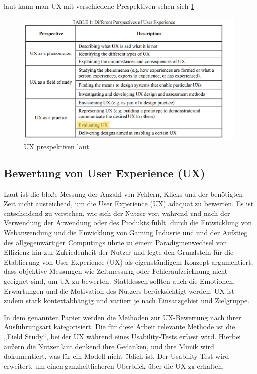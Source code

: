 \documentclass[12pt,oneside]{article}
\begin{document}
laut \cite{GOISTAI} kann man UX mit verschiedene Prespektiven sehen sieh \ref{fig:1}
\begin{figure}[b!]
\centering
 \includegraphics[width=15cm]{UXprespektiven.png}
		\caption{UX prespektiven laut \cite{GOISTAI}}
		\label{fig:1}
\end{figure}



\subsection{Bewertung von User Experience (UX)}

Laut \cite{GOISTAI} ist die bloße Messung der Anzahl von Fehlern, Klicks und der benötigten Zeit nicht ausreichend, um die User Experience (UX) adäquat zu bewerten. Es ist entscheidend zu verstehen, wie sich der Nutzer vor, während und nach der Verwendung der Anwendung oder des Produkts fühlt.
durch die Entwicklung von Webanwendung und die Enwicklung von Gaming Indusrie und und der Aufstieg des allgegenwärtigen Computings ührte zu einem Paradigmenwechsel von Effizienz hin zur Zufriedenheit der Nutzer und legte den Grundstein für die Etablierung von User Experience (UX) als eigenständigem Konzept \cite{glanznig}
\cite{Virpi} argumentiert, dass objektive Messungen wie Zeitmessung oder Fehleraufzeichnung nicht geeignet sind, um UX zu bewerten. Stattdessen sollten auch die Emotionen, Erwartungen und die Motivation des Nutzers berücksichtigt werden. UX ist zudem stark kontextabhängig und variiert je nach Einsatzgebiet und Zielgruppe.

In dem genannten Papier werden die Methoden zur UX-Bewertung nach ihrer Ausführungsart kategorisiert. Die für diese Arbeit relevante Methode ist die „Field Study“, bei der UX während eines Usability-Tests erfasst wird. Hierbei äußern die Nutzer laut denkend ihre Gedanken, und ihre Mimik wird dokumentiert, was für ein Modell nicht üblich ist. Der Usability-Test wird erweitert, um einen ganzheitlicheren Überblick über die UX zu erhalten.
\end{document}
